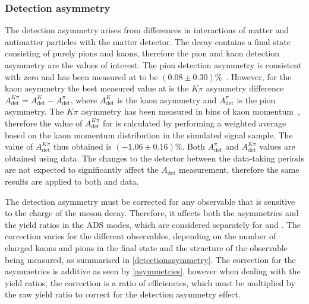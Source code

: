 \subsubsection{Detection asymmetry}

The detection asymmetry arises from differences in interactions of matter and antimatter particles with the matter detector. The \btodkst decay contains a final state consisting of purely pions and kaons, therefore the pion and kaon detection asymmetry are the values of interest. The pion detection asymmetry is consistent with zero and has been measured at \lhcb to be $(0.08 \pm 0.30)\%$~\cite{pi_det_asym}. However, for the kaon asymmetry the best measured value at \lhcb is the $K\pi$ asymmetry difference $A_{\text{det}}^{K\pi} = A_{\text{det}}^K - A_{\text{det}}^{\pi}$, where $A_{\text{det}}^K$ is the kaon asymmetry and $A_{\text{det}}^{\pi}$ is the pion asymmetry. The $K\pi$ asymmetry has been measured in bins of kaon momentum~\cite{k_det_asym}, therefore the value of $A_{\text{det}}^{K\pi}$ for \btodkst is calculated by performing a weighted average based on the kaon momentum distribution in the simulated signal sample. The value of $A_{\text{det}}^{K\pi}$ thus obtained is $(-1.06 \pm 0.16)\%$. Both $A_{\text{det}}^{\pi}$ and $A_{\text{det}}^{K\pi}$ values are obtained using \runone data. The changes to the detector between the data-taking periods are not expected to significantly affect the $A_{\text{det}}$ measurement, therefore the same results are applied to both \runone and \runtwo data. 

The detection asymmetry must be corrected for any \CP observable that is sensitive to the charge of the \B meson decay. Therefore, it affects both the asymmetries and the yield ratios in the ADS modes, which are considered separately for \Bm and \Bp. The correction varies for the different \CP observables, depending on the number of charged kaons and pions in the final state and the structure of the \CP observable being measured, as summarised in \Tab\ref{detectionasymmetry}. The correction for the asymmetries is additive as seen by \eqn\ref{asymmetries}, however when dealing with the yield ratios, the correction is a ratio of efficiencies, which must be multiplied by the raw yield ratio to correct for the detection asymmetry effect.


